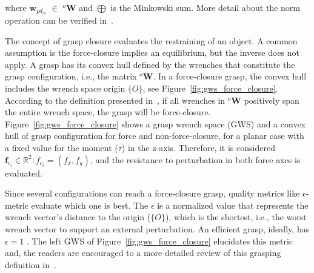 \noindent
where $\mathbf{w}_{pd_{ci}}$ $\in$ $^o\mathbf{W}$ and $\bigoplus$ is the Minkowski sum. More detail about the norm operation can be verified in~\cite{Ferrari}.


The concept of grasp closure evaluates the restraining of an object. A common assumption is the force-closure implies an equilibrium, but the inverse does not apply. A grasp has its convex hull defined by the wrenches that constitute the grasp configuration, i.e., the matrix $^{o} \mathbf{W}$. In a force-closure grasp, the convex hull includes the wrench space origin $\{O\}$, see Figure~\ref{fig:gws_force_closure}. According to the definition presented in~\cite{salisbury1983kinematic}, if all wrenches in $^{o} \mathbf{W}$ positively span the entire wrench space, the grasp will be force-closure. Figure~\ref{fig:gws_force_closure} shows a  grasp wrench space (GWS) and a convex hull of grasp configuration for force and non-force-closure, for a planar case with a fixed value for the moment ($\tau$) in the z-axis. Therefore, it is considered $\mathbf{f}_{c_i} \in  \mathbb{R}^2:  {f}_{c_i}  = (f_{x} , f_{y})$, and  the resistance to perturbation in both force axes is evaluated. 

\begin{figure}[h!]
\end{figure}

Since several configurations can reach a force-closure grasp, quality metrics like $\epsilon$-metric evaluate which one is best. The $\epsilon$ is a normalized value that represents the wrench vector's distance to the origin ($\{O\}$), which is the shortest, i.e., the worst wrench vector to support an external perturbation. An efficient grasp, ideally, has $\epsilon=1$ . The left GWS of Figure~\ref{fig:gws_force_closure} elucidates this metric and, the readers are encouraged to a more detailed review of this grasping definition in~\cite{Ferrari}.


